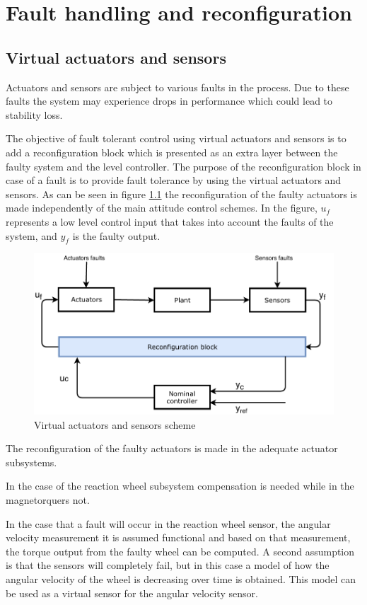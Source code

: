 \chapter{Fault handling and reconfiguration}  \label{chap:faltHandling}
 \section{Virtual actuators and sensors} \label{chap: virtual}
 Actuators and sensors are subject to various faults in the process. Due to these faults the system may experience drops in performance which could lead to stability loss.
 
 The objective of fault tolerant control using virtual actuators and sensors is to add a reconfiguration block which is presented as an extra layer between the faulty system and the level controller. The purpose of the reconfiguration block in case of a fault is to provide fault tolerance by using the virtual actuators and sensors. As can be seen in figure \ref{fig:VA} the reconfiguration of the faulty actuators is made independently of the main attitude control schemes.  In the figure, $u_f$ represents a low level control input that takes into account the faults of the system, and $y_f$ is the faulty output. 
 \begin{figure}[H]
 	\centering
 	\includegraphics[width=0.8\linewidth]{figures/VirtualActuator}
 	\caption{ Virtual actuators and sensors scheme}
 	\label{fig:VA}
 \end{figure}
 
 The reconfiguration of the faulty actuators is made in the adequate actuator subsystems. 
 
 In the case of the reaction wheel subsystem compensation is needed while in the magnetorquers not.
 
 In the case that a fault will occur in the reaction wheel sensor, the angular velocity measurement it is assumed functional and based on that measurement, the torque output from the faulty wheel can be computed. A second assumption is that the sensors will completely fail, but in this case a model of how the angular velocity of the wheel is decreasing over time is obtained. This model can be used as a virtual sensor for the angular velocity sensor. 
 
